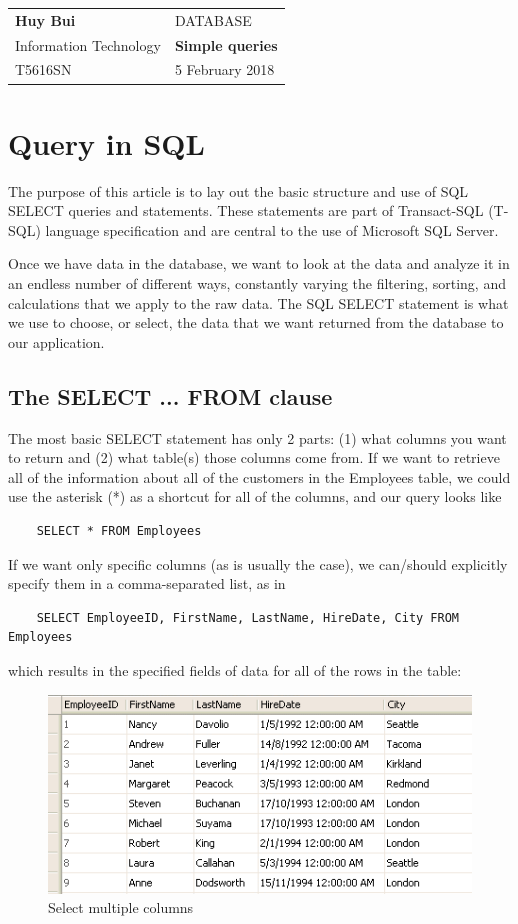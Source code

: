 \documentclass[10pt,a4paper]{article}
\author{Huy Bui}
\begin{document}
\begin{tabular}{p{8cm}l}
	\textbf{Huy Bui}		&	\textsc{DATABASE}			\\
	Information Technology	&	\textbf{Simple queries}	\\
	T5616SN					&	5 February 2018				\\
\end{tabular}
\section{Query in SQL}
The purpose of this article is to lay out the basic structure and use of SQL SELECT queries and statements. These statements are part of Transact-SQL (T-SQL) language specification and are central to the use of Microsoft SQL Server.\par 
Once we have data in the database, we want to look at the data and analyze it in an endless number of different ways, constantly varying the filtering, sorting, and calculations that we apply to the raw data. The SQL SELECT statement is what we use to choose, or select, the data that we want returned from the database to our application.
\subsection{The SELECT ... FROM clause}
The most basic SELECT statement has only 2 parts: (1) what columns you want to return and (2) what table(s) those columns come from. If we want to retrieve all of the information about all of the customers in the Employees table, we could use the asterisk (*) as a shortcut for all of the columns, and our query looks like
\begin{lstlisting}
	SELECT * FROM Employees
\end{lstlisting}
If we want only specific columns (as is usually the case), we can/should explicitly specify them in a comma-separated list, as in
\begin{lstlisting}
	SELECT EmployeeID, FirstName, LastName, HireDate, City FROM Employees
\end{lstlisting}
which results in the specified fields of data for all of the rows in the table:
\begin{figure}[hbtp]
	\centering
	\includegraphics[scale=1]{example.png}
	\caption{Select multiple columns}
	\end{figure}
 
\end{document}
